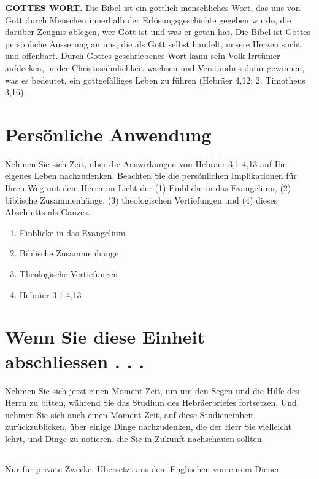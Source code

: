 \documentclass[]{krantz}
\providecommand{\tightlist}{%
  \setlength{\itemsep}{0pt}\setlength{\parskip}{0pt}}
\begin{document}
\textbf{GOTTES WORT.} Die Bibel ist ein göttlich-menschliches Wort, das
uns von Gott durch Menschen innerhalb der Erlösungsgeschichte gegeben
wurde, die darüber Zeugnis ablegen, wer Gott ist und was er getan hat.
Die Bibel ist Gottes persönliche Äusserung an uns, die als Gott selbst
handelt, unsere Herzen sucht und offenbart. Durch Gottes geschriebenes
Wort kann sein Volk Irrtümer aufdecken, in der Christusähnlichkeit
wachsen und Verständnis dafür gewinnen, was es bedeutet, ein
gottgefälliges Leben zu führen (Hebräer 4,12; 2. Timotheus 3,16).

\section{Persönliche Anwendung}\label{persuxf6nliche-anwendung-2}

Nehmen Sie sich Zeit, über die Auswirkungen von Hebräer 3,1-4,13 auf Ihr
eigenes Leben nachzudenken. Beachten Sie die persönlichen Implikationen
für Ihren Weg mit dem Herrn im Licht der (1) Einblicke in das
Evangelium, (2) biblische Zusammenhänge, (3) theologischen Vertiefungen
und (4) dieses Abschnitts als Ganzes.

\begin{enumerate}
\def\labelenumi{\arabic{enumi}.}
\tightlist
\item
  Einblicke in das Evangelium
\item
  Biblische Zusammenhänge
\item
  Theologische Vertiefungen
\item
  Hebräer 3,1-4,13
\end{enumerate}

\section{Wenn Sie diese Einheit abschliessen . .
.}\label{wenn-sie-diese-einheit-abschliessen-.-.-.-2}

Nehmen Sie sich jetzt einen Moment Zeit, um um den Segen und die Hilfe
des Herrn zu bitten, während Sie das Studium des Hebräerbriefes
fortsetzen. Und nehmen Sie sich auch einen Moment Zeit, auf diese
Studieneinheit zurückzublicken, über einige Dinge nachzudenken, die der
Herr Sie vielleicht lehrt, und Dinge zu notieren, die Sie in Zukunft
nachschauen sollten.

\begin{center}\rule{0.5\linewidth}{0.5pt}\end{center}

Nur für private Zwecke. Übersetzt aus dem Englischen von eurem Diener
\end{document}
